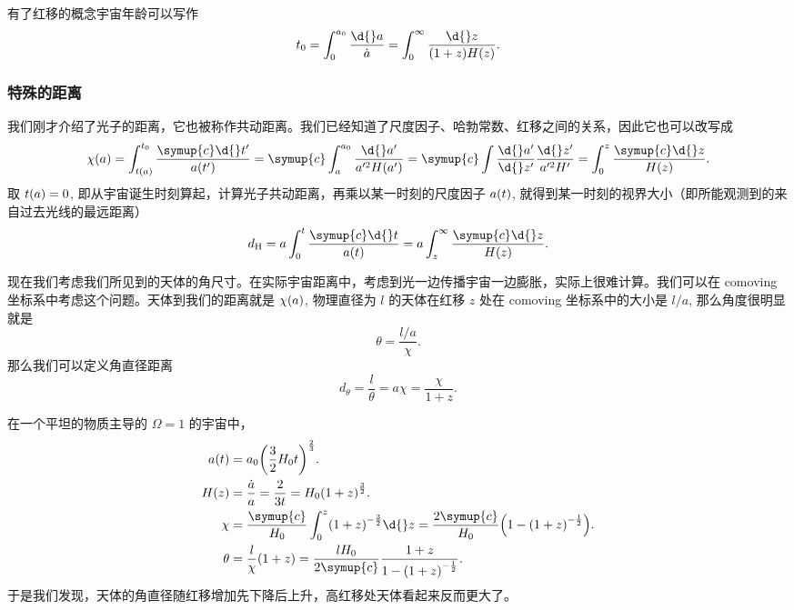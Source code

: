 \documentclass[../天体物理基础.tex]{subfiles}
\begin{document}
有了红移的概念宇宙年龄可以写作
\begin{equation}
t_{0}=\int_{0}^{a_{0}}\frac{\d{}a}{\dot a}=\int_{0}^{\infty}\frac{\d{}z}{\mleft(1+z\mright) H\mleft(z\mright)}.
\end{equation}

\subsubsection{特殊的距离}
我们刚才介绍了光子的距离，它也被称作共动距离。我们已经知道了尺度因子、哈勃常数、红移之间的关系，因此它也可以改写成
\begin{equation}
\chi\mleft(a\mright)=\int_{t\mleft(a\mright)}^{t_{0}}\frac{\symup{c}\d{}t'}{a\mleft(t'\mright)}=\symup{c}\int_{a}^{a_{0}}\frac{\d{}a'}{a'^{2}H\mleft(a'\mright)}=\symup{c}\int\frac{\d{}a'}{\d{}z'}\frac{\d{}z'}{a'^{2}H'}=\int_{0}^{z}\frac{\symup{c}\d{}z}{H\mleft(z\mright)}.
\end{equation}
取 $t\mleft(a\mright)=0$, 即从宇宙诞生时刻算起，计算光子共动距离，再乘以某一时刻的尺度因子 $a\mleft(t\mright)$, 就得到某一时刻的视界大小（即所能观测到的来自过去光线的最远距离）
\begin{equation}
d_{\mathrm{H}}=a\int_{0}^{t}\frac{\symup{c}\d{}t}{a\mleft(t\mright)}=a\int_{z}^{\infty}\frac{\symup{c}\d{}z}{H\mleft(z\mright)}.
\end{equation}

现在我们考虑我们所见到的天体的角尺寸。在实际宇宙距离中，考虑到光一边传播宇宙一边膨胀，实际上很难计算。我们可以在 comoving 坐标系中考虑这个问题。天体到我们的距离就是 $\chi\mleft(a\mright)$, 物理直径为 $l$ 的天体在红移 $z$ 处在 comoving 坐标系中的大小是 $l/a$, 那么角度很明显就是
\begin{equation}
\theta=\frac{l/a}{\chi}.
\end{equation}
那么我们可以定义角直径距离
\begin{equation}
d_{\theta}=\frac{l}{\theta}=a\chi=\frac{\chi}{1+z}.
\end{equation}

在一个平坦的物质主导的 $\Omega=1$ 的宇宙中，
\begin{align}
a\mleft(t\mright)&=a_{0}\mleft(\frac{3}{2}H_{0}t\mright)^{\frac{2}{3}}.\notag\\
H\mleft(z\mright)&=\frac{\dot a}{a}=\frac{2}{3t}=H_{0}\mleft(1+z\mright)^{\frac{3}{2}}.\notag\\
\chi&=\frac{\symup{c}}{H_{0}}\int_{0}^{z}\mleft(1+z\mright)^{-\frac{3}{2}}\d{}z=\frac{2\symup{c}}{H_{0}}\mleft(1-\mleft(1+z\mright)^{-\frac{1}{2}}\mright).\notag\\
\theta&=\frac{l}{\chi}\mleft(1+z\mright)=\frac{lH_{0}}{2\symup{c}}\frac{1+z}{1-\mleft(1+z\mright)^{-\frac{1}{2}}}.
\end{align}
于是我们发现，天体的角直径随红移增加先下降后上升，高红移处天体看起来反而更大了。
\end{document}
